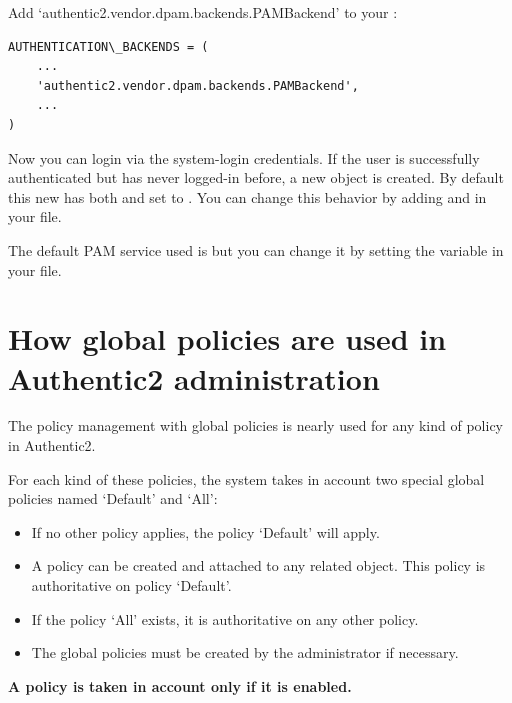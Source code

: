 \documentclass[letterpaper,10pt,english]{sphinxmanual}
\begin{document}
Add `authentic2.vendor.dpam.backends.PAMBackend' to your
:

\begin{Verbatim}[commandchars=\\\{\}]
AUTHENTICATION\_BACKENDS = (
    ...
    'authentic2.vendor.dpam.backends.PAMBackend',
    ...
)
\end{Verbatim}

Now you can login via the system-login credentials.  If the user is
successfully authenticated but has never logged-in before, a new 
object is created.  By default this new  has both  and
 set to .  You can change this behavior by adding
 and  in your  file.

The default PAM service used is  but you can change it by setting the
 variable in your  file.


\section{How global policies are used in Authentic2 administration}
\label{administration_with_policies:how-global-policies-are-used-in-authentic2-administration}\label{administration_with_policies:administration-with-policies}\label{administration_with_policies::doc}
The policy management with global policies is nearly used for any kind of
policy in Authentic2.

For each kind of these policies, the system takes in account two special
global policies named `Default' and `All':
\begin{itemize}
\item {} 
If no other policy applies, the policy `Default' will apply.

\item {} 
A policy can be created and attached to any related object. This policy is authoritative on policy `Default'.

\item {} 
If the policy `All' exists, it is authoritative on any other policy.

\item {} 
The global policies must be created by the administrator if necessary.

\end{itemize}

\textbf{A policy is taken in account only if it is enabled.}
\end{document}
